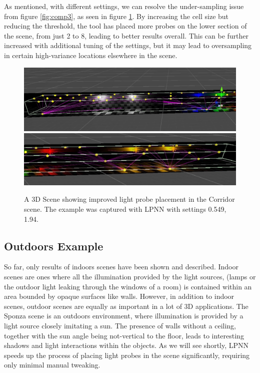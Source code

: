 As mentioned, with different settings, we can resolve the under-sampling issue from figure \ref{fig:comp3}, as seen in figure \ref{fig:comp4}. By increasing the cell size but reducing the threshold, the tool has placed more probes on the lower section of the scene, from just 2 to 8, leading to better results overall. This can be further increased with additional tuning of the settings, but it may lead to oversampling in certain high-variance locations elsewhere in the scene.

\begin{figure}[h]
	\centering
	\includegraphics[width=\linewidth]{Graphics/results/corridor_0.549_1.94_E2.jpg}
	\includegraphics[width=\linewidth]{Graphics/results/corridor_0.549_1.94_E3.jpg}
	\caption{A 3D Scene showing improved light probe placement in the Corridor scene. The example was captured with LPNN with settings 0.549, 1.94.}
	\label{fig:comp4}
\end{figure}


\subsection{Outdoors Example}
\label{sec:outdoors}

So far, only results of indoors scenes have been shown and described. Indoor scenes are ones where all the illumination provided by the light sources, (lamps or the outdoor light leaking through the windows of a room) is contained within an area bounded by opaque surfaces like walls. However, in addition to indoor scenes, outdoor scenes are equally as important in a lot of 3D applications. The Sponza scene \parencite{Sponza2017} is an outdoors environment, where illumination is provided by a light source closely imitating a sun. The presence of walls without a ceiling, together with the sun angle being not-vertical to the floor, leads to interesting shadows and light interactions within the objects. As we will see shortly, LPNN speeds up the process of placing light probes in the scene significantly, requiring only minimal manual tweaking.

